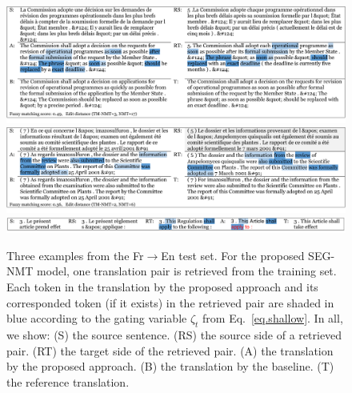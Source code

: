 \begin{figure}[t]
\centering
\includegraphics[width=0.8\linewidth]{figs/seg/example-c2.pdf}
\centering
\includegraphics[width=0.8\linewidth]{figs/seg/example-d2.pdf}
\centering
\includegraphics[width=0.8\linewidth]{figs/seg/example-g3.pdf}
\caption{\label{fig:examples} 
Three examples from the Fr$\to$En test set. For the proposed SEG-NMT model, one translation pair is retrieved from the training set. Each token in the translation by the proposed approach and its corresponded token (if it exists) in the retrieved pair are shaded in blue according to the gating variable $\zeta_t$ from Eq.~\eqref{eq.shallow}. In all, we show: (S) the source sentence. (RS) the source side of a retrieved pair. (RT) the target side of the retrieved pair.
(A) the translation by the proposed approach. (B) the translation by the baseline. (T) the reference translation.
}

\end{figure}

